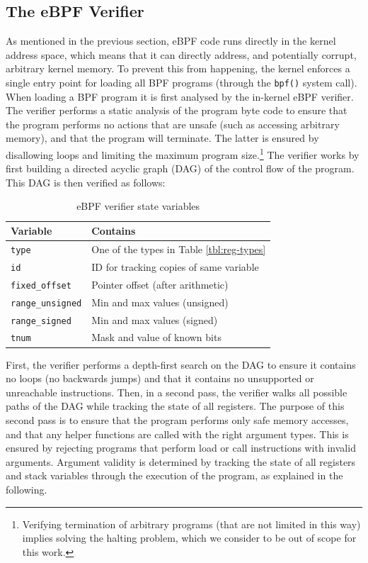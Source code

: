 \documentclass[10pt,sigconf]{acmart}
\begin{document}
\subsection{The eBPF Verifier}
\label{sec:bpf-verifier}
As mentioned in the previous section, eBPF code runs directly in the kernel
address space, which means that it can directly address, and potentially
corrupt, arbitrary kernel memory. To prevent this from happening, the kernel
enforces a single entry point for loading all BPF programs (through the
\texttt{bpf()} system call). When loading a BPF program it is first analysed by
the in-kernel eBPF verifier. The verifier performs a static analysis of the
program byte code to ensure that the program performs no actions that are unsafe
(such as accessing arbitrary memory), and that the program will terminate. The
latter is ensured by disallowing loops and limiting the maximum program
size.\footnote{Verifying termination of arbitrary programs (that are not limited
  in this way) implies solving the halting problem, which we consider to be out
  of scope for this work.} The verifier works by first building a directed
acyclic graph (DAG) of the control flow of the program. This DAG is then
verified as follows:

\begin{table}[tbp]
\caption{\label{tbl:vrf-state-vars}
eBPF verifier state variables}
\centering
\begin{tabular}{ll}
\toprule
Variable & Contains\\
\midrule
\texttt{type} & One of the types in Table \ref{tbl:reg-types}\\
\texttt{id} & ID for tracking copies of same variable\\
\texttt{fixed\_offset} & Pointer offset (after arithmetic)\\
\texttt{range\_unsigned} & Min and max values (unsigned)\\
\texttt{range\_signed} & Min and max values (signed)\\
\texttt{tnum} & Mask and value of known bits\\
\bottomrule
\end{tabular}
\end{table}

First, the verifier performs a depth-first search on the DAG to ensure it
contains no loops (no backwards jumps) and that it contains no unsupported or
unreachable instructions. Then, in a second pass, the verifier walks all
possible paths of the DAG while tracking the state of all registers. The purpose
of this second pass is to ensure that the program performs only safe memory
accesses, and that any helper functions are called with the right argument
types. This is ensured by rejecting programs that perform load or call
instructions with invalid arguments. Argument validity is determined by tracking
the state of all registers and stack variables through the execution of the
program, as explained in the following.
\end{document}

